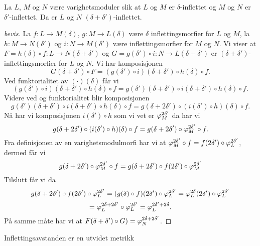 \begin{lemma}\label{lem:Inf_Sum}
La $L$, $M$ og $N$ være varighetsmoduler slik at $L$ og $M$ er $\delta$-inflettet og $M$ og $N$ er $\delta'$-inflettet. Da er $L$ og $N$ $(\delta+\delta')$-inflettet.
\end{lemma}
\begin{proof}[bevis]
La $f: L\to M(\delta)$, $g: M\to L(\delta)$ være $\delta$ inflettingsmorfier for $L$ og $M$, la $h: M\to N(\delta')$ og $i: N\to M(\delta')$ være inflettingsmorfier for $M$ og $N$. Vi viser at $F = h(\delta)\circ f:L\to N(\delta+\delta')$ og $G=g(\delta')\circ i: N\to L(\delta+\delta')$ er $(\delta+\delta')$-inflettingsmorfier for $L$ og $N$. Vi har komposisjonen
\[G(\delta+\delta')\circ F = (g(\delta')\circ i)(\delta+\delta')\circ h(\delta)\circ f.\]
Ved funktorialitet av $(\cdot)(\delta)$ får vi
\[(g(\delta')\circ i)(\delta+\delta')\circ h(\delta)\circ f = g(\delta')(\delta+\delta')\circ i(\delta+\delta')\circ h(\delta)\circ f.\]
Videre ved  og funktorialitet blir komposisjonen
\[g(\delta')(\delta+\delta')\circ i(\delta+\delta')\circ h(\delta)\circ f= g(\delta+2\delta')\circ (i(\delta')\circ h)(\delta)\circ f.\]
Nå har vi komposisjonen $i(\delta')\circ h$ som vi vet er $\varphi^{2\delta'}_M$ da har vi
\[g(\delta+2\delta')\circ (i(\delta')\circ h)(\delta)\circ f=g(\delta+2\delta')\circ\varphi_M^{2\delta'}\circ f.\]
Fra definisjonen av en varighetsmodulmorfi har vi at $\varphi_M^{2\delta'}\circ f=f(2\delta')\circ\varphi_L^{2\delta'}$, dermed får vi
\[g(\delta+2\delta')\circ\varphi_M^{2\delta'}\circ f=g(\delta+2\delta')\circ f(2\delta')\circ \varphi_M^{2\delta'}\]
Tilslutt får vi da
\[g(\delta+2\delta')\circ f(2\delta')\circ \varphi_L^{2\delta'}=(g(\delta)\circ f)(2\delta')\circ\varphi_L^{2\delta'} = \varphi_L^{2\delta}(2\delta')\circ \varphi_L^{2\delta'}\]
\[=\varphi_L^{2\delta+2\delta'}\circ \varphi_L^{2\delta'}=\varphi_L^{2\delta'+2\delta}.\]
På samme måte har vi at $F(\delta+\delta')\circ G)=\varphi_N^{2\delta+2\delta'}$.
\end{proof}

\begin{teorem}\label{trm:Utvidet-Metrikk}
  Inflettingsavstanden er en utvidet metrikk
\end{teorem}

